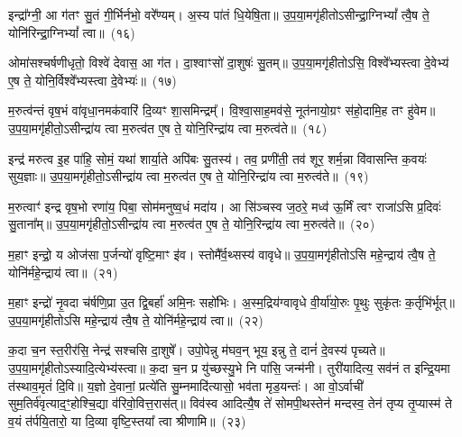 {\anuvakamend[{मधु॑स्त्रि॒ꣳ॒शत्}]}%

इन्द्रा᳚ग्नी॒ आ ग॑तꣳ सु॒तं गी॒र्भिर्नभो॒ वरे᳚ण्यम्। अ॒स्य पा॑तं धि॒येषि॒ता॥ उ॒प॒या॒मगृ॑हीतो\-ऽसीन्द्रा॒ग्नि\-भ्यां᳚ त्वै॒ष ते॒ योनि॑रिन्द्रा॒ग्नि\-भ्यां᳚ त्वा॥~(१६)

{\anuvakamend[{इन्द्रा᳚ग्नी विꣳश॒तिः}]}%

ओमा॑सश्चर्\mbox{}षणीधृतो॒ विश्वे॑ देवास॒ आ ग॑त। दा॒श्वाꣳसो॑ दा॒शुषः॑ सु॒तम्॥ उ॒प॒या॒मगृ॑हीतो\-ऽसि॒ विश्वे᳚भ्यस्त्वा दे॒वेभ्य॑ ए॒ष ते॒ योनि॒र्विश्वे᳚भ्यस्त्वा दे॒वेभ्यः॑॥~(१७)

{\anuvakamend[{इन्द्रा᳚ग्नी॒ ओमा॑सो विꣳश॒तिर्विꣳ॑शतिः}]}%

म॒रुत्व॑न्तं वृष॒भं वा॑वृधा॒नमक॑वारिं दि॒व्यꣳ शा॒समिन्द्रम्᳚। वि॒श्वा॒साह॒मव॑से॒ नूत॑नायो॒ग्रꣳ स॑हो॒दामि॒ह तꣳ हु॑वेम॥ उ॒प॒या॒मगृ॑हीतो॒\-ऽसीन्द्रा॑य त्वा म॒रुत्व॑त ए॒ष ते॒ योनि॒रिन्द्रा॑य त्वा म॒रुत्व॑ते॥~(१८)

{\anuvakamend[{म॒रुत्व॑न्त॒ꣳ॒ षड्विꣳ॑शतिः}]}%

इन्द्र॑ मरुत्व इ॒ह पा॑हि॒ सोमं॒ यथा॑ शार्या॒ते अपि॑बः सु॒तस्य॑। तव॒ प्रणी॑ती॒ तव॑ शूर॒ शर्म॒न्ना वि॑वासन्ति क॒वयः॑ सुय॒ज्ञाः॥ उ॒प॒या॒मगृ॑हीतो॒\-ऽसीन्द्रा॑य त्वा म॒रुत्व॑त ए॒ष ते॒ योनि॒रिन्द्रा॑य त्वा म॒रुत्व॑ते॥~(१९)

{\anuvakamend[{इन्द्रैका॒न्नत्रि॒ꣳ॒शत्}]}%

म॒रुत्वाꣳ॑ इन्द्र वृष॒भो रणा॑य॒ पिबा॒ सोम॑मनुष्व॒धं मदा॑य। आ सि॑ञ्चस्व ज॒ठरे॒ मध्व॑ ऊ॒र्मिं त्वꣳ राजा॑\-ऽसि प्र॒दिवः॑ सु॒ताना᳚म्॥ उ॒प॒या॒मगृ॑हीतो॒\-ऽसीन्द्रा॑य त्वा म॒रुत्व॑त ए॒ष ते॒ योनि॒रिन्द्रा॑य त्वा म॒रुत्व॑ते॥~(२०)

{\anuvakamend[{इन्द्र॑ मरुत्वो म॒रुत्वा॒नेका॒न्न त्रि॒ꣳ॒शदेका॒न्न त्रि॒ꣳ॒शत्}]}%

म॒हाꣳ इन्द्रो॒ य ओज॑सा प॒र्जन्यो॑ वृष्टि॒माꣳ इ॑व। स्तोमै᳚र्व॒थ्सस्य॑ वावृधे॥ उ॒प॒या॒मगृ॑हीतो\-ऽसि महे॒न्द्राय॑ त्वै॒ष ते॒ योनि॑र्महे॒न्द्राय॑ त्वा॥~(२१)

{\anuvakamend[{म॒हानेका॒न्नविꣳ॑शतिः}]}%

म॒हाꣳ इन्द्रो॑ नृ॒वदा च॑र्\mbox{}षणि॒प्रा उ॒त द्वि॒बर्\mbox{}हा॑ अमि॒नः सहो॑भिः। अ॒स्म॒द्रिय॑ग्वावृधे वी॒र्या॑यो॒रुः पृ॒थुः सुकृ॑तः क॒र्तृभि॑र्भूत्॥ उ॒प॒या॒मगृ॑हीतो\-ऽसि महे॒न्द्राय॑ त्वै॒ष ते॒ योनि॑र्महे॒न्द्राय॑ त्वा॥~(२२)

{\anuvakamend[{म॒हान्नृ॒वत्षड्विꣳ॑शतिः}]}%

क॒दा च॒न स्त॒रीर॑सि॒ नेन्द्र॑ सश्चसि दा॒शुषे᳚। उपो॒पेन्नु म॑घव॒न् भूय॒ इन्नु ते॒ दानं॑ दे॒वस्य॑ पृच्यते॥ उ॒प॒या॒मगृ॑हीतो\-ऽस्यादि॒त्येभ्य॑स्त्वा॥ क॒दा च॒न प्र यु॑च्छस्यु॒भे नि पा॑सि॒ जन्म॑नी। तुरी॑यादित्य॒ सव॑नं त इन्द्रि॒यमा त॑स्थाव॒मृतं॑ दि॒वि॥ य॒ज्ञो दे॒वानां॒ प्रत्ये॑ति सु॒म्नमादि॑त्यासो॒ भव॑ता मृड॒यन्तः॑। आ वो॒\-ऽर्वाची॑ सुम॒तिर्व॑वृत्याद॒ꣳ॒होश्चि॒द्या व॑रिवो॒वित्त॒रास॑त्॥ विव॑स्व आदित्यै॒ष ते॑ सोमपी॒थस्तेन॑ मन्दस्व॒ तेन॑ तृप्य तृ॒प्यास्म॑ ते व॒यं त॑र्पयि॒तारो॒ या दि॒व्या वृष्टि॒स्तया᳚ त्वा श्रीणामि॥~(२३)

